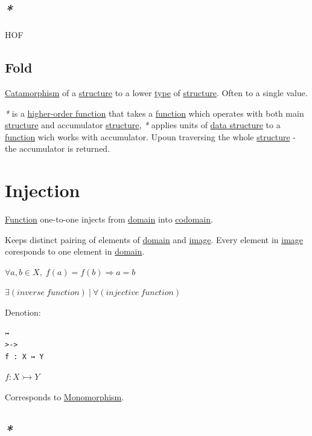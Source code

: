 \documentclass[a4paper,14pt,oneside]{book}
\begin{document}
\subsection{\emph{*}}
\label{sec:org5cd5cc6}

\label{org70d38db}HOF

\subsection{\label{org85e4646}Fold}
\label{sec:org47aeebc}
\hyperref[orgd0787b4]{Catamorphism} of a \hyperref[org105c77d]{structure} to a lower \hyperref[orgde40363]{type} of \hyperref[org105c77d]{structure}. Often to a single value.

\emph{*} is a \hyperref[orgd4bfd3e]{higher-order function} that takes a \hyperref[orgc39a15c]{function} which operates with both main \hyperref[org105c77d]{structure} and accumulator \hyperref[org105c77d]{structure}, \emph{*} applies units of \hyperref[org627fed1]{data structure} to a \hyperref[orgc39a15c]{function} wich works with accumulator. Upoun traversing the whole \hyperref[org105c77d]{structure} - the accumulator is returned.

\section{\label{org7bccf3a}Injection}
\label{sec:org3b45ec1}
\hyperref[orgc39a15c]{Function} one-to-one injects from \hyperref[orga435ae0]{domain} into \hyperref[orgc81ff1a]{codomain}.

Keeps distinct pairing of elements of \hyperref[orga435ae0]{domain} and \hyperref[orgd75a795]{image}.
Every element in \hyperref[orgd75a795]{image} coresponds to one element in \hyperref[orga435ae0]{domain}.

\(\forall a,b \in X, \; f(a)=f(b) \Rightarrow a=b\)

\(\exists (inverse \ function) \ | \ \forall (injective \ function)\)

Denotion:
\begin{verbatim}
↣
>->
f : X ↣ Y
\end{verbatim}
\(f : X \rightarrowtail Y\)

Corresponds to \hyperref[org9e520fb]{Monomorphism}.

\subsection{\emph{*}}
\label{sec:org89ff160}
\end{document}
